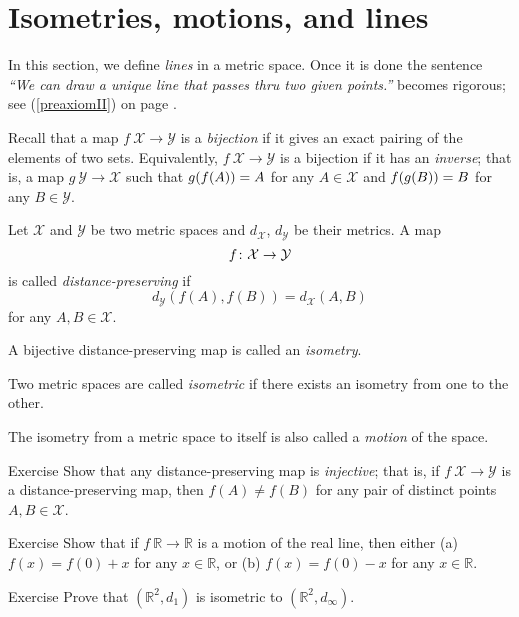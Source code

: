 \section*{Isometries, motions, and lines}

In this section, we define {}\emph{lines} in a metric space.
Once it is done the sentence {}\emph{``We can draw a unique line that passes thru two given points.''} becomes rigorous; see (\ref{preaxiomII}) on page \pageref{preaxiomII}. 

Recall that a map $f\:\mathcal{X}\to\mathcal{Y}$
is a \emph{bijection}
if it gives an exact pairing of the elements of two sets.
Equivalently, $f\:\mathcal{X}\to\mathcal{Y}$ is a bijection if it has an \emph{inverse};
that is, a map $g\:\mathcal{Y}\to\mathcal{X}$
such that 
$g(f(A))\z=A$ for any $A\in\mathcal{X}$
and
$f(g(B))\z=B$ for any $B\in\mathcal{Y}$. 

Let $\mathcal X$ and $\mathcal Y$ be two metric spaces and $d_{\mathcal X}$, $d_{\mathcal Y}$ be their metrics. 
A map 
$$f\:\mathcal X \z\to \mathcal Y$$ 
is
called \emph{distance-preserving} if 
$$d_{\mathcal Y}(f(A), f(B))
 = d_{\mathcal X}(A,B)$$
for any $A,B\in {\mathcal X}$.

A bijective distance-preserving map is called an \emph{isometry}. 

Two metric spaces are called
\emph{isometric} if there exists an isometry from one to the other.

The isometry from a metric space to itself 
is also called a \emph{motion} of the space.

\begin{thm}{Exercise}\label{ex:dist-preserv=>injective}
Show that any distance-preserving map is \emph{injective};
that is, if $f\:\mathcal X\to\mathcal Y$ is a distance-preserving map, 
then $f(A)\ne f(B)$ for any pair of distinct points $A, B\in \mathcal X$.
\end{thm}

\begin{thm}{Exercise}\label{ex:motion-of-R}
Show that if $f\:\mathbb{R}\to\mathbb{R}$ is a motion of the real line,
then either (a)
$f(x)=f(0)+x$ for any $x\in \mathbb{R}$, 
or (b)
$f(x)=f(0)-x$ for any $x\in \mathbb{R}$. 

\end{thm}

\begin{thm}{Exercise}\label{ex:d_1=d_infty}
Prove that $(\mathbb{R}^2,d_1)$ is isometric to $(\mathbb{R}^2,d_\infty)$.
\end{thm}

